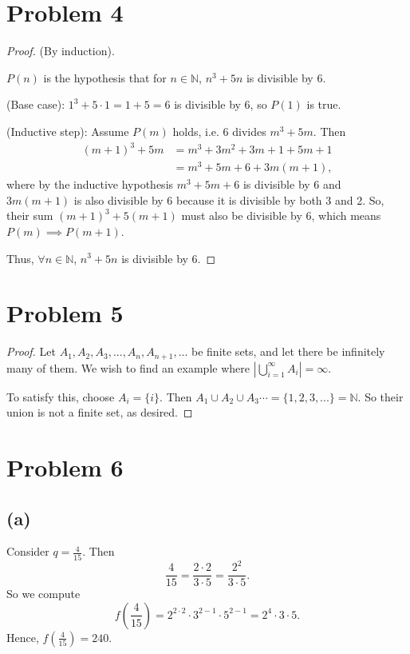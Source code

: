 \documentclass{article}
\begin{document}
\section*{Problem 4}
\begin{proof}
	(By induction). 
	
	$P(n)$ is the hypothesis that for $n\in\mathbb{N}$, $n^3 + 5n$ is divisible by $6$.
	
	(Base case): $1^3 + 5\cdot1 = 1 + 5 = 6$ is divisible by 6, so $P(1)$ is true. 
	
	(Inductive step): Assume $P(m)$ holds, i.e. 6 divides $m^3 + 5m$. Then
	\begin{align}
		(m+1)^3 + 5m &= m^3 + 3m^2 + 3m + 1 + 5m + 1 \\
		&= m^3 + 5m + 6 + 3m(m+1), 
	\end{align}
	where by the inductive hypothesis $m^3 +5m + 6$ is divisible by 6 and $3m(m+1)$ is also divisible by 6 because it is divisible by both 3 and 2. So, their sum $(m+1)^3 + 5(m+1)$ must also be divisible by 6, which means $P(m)\implies P(m+1)$.
	
	Thus, $\forall n\in\mathbb{N}$, $n^3 + 5n$ is divisible by 6. 
\end{proof}

\section*{Problem 5}
\begin{proof}
	Let $A_1, A_2, A_3, ..., A_n, A_{n+1}, ...$ be finite sets, and let there be infinitely many of them. We wish to find an example where $|\bigcup\limits_{i=1}^{\infty} A_i| = \infty$. 
	
	To satisfy this, choose $A_{i} = \{i\}$. Then $A_1 \cup A_2 \cup A_3 \cdots = \{1, 2, 3, ... \} = \mathbb{N}$. So their union is not a finite set, as desired. 
\end{proof}

\section*{Problem 6}
\subsection*{(a)}
Consider $q=\frac{4}{15}$. Then 
\begin{equation}
	\frac{4}{15} = \frac{2\cdot2}{3\cdot5} = \frac{2^2}{3\cdot5}.
\end{equation}
So we compute
\begin{equation}
	f(\frac{4}{15}) = 2^{2\cdot2} \cdot 3^{2-1}\cdot5^{2-1} = 2^4\cdot3\cdot5.
\end{equation}
Hence, $f(\frac{4}{15})=240$.
\end{document}
